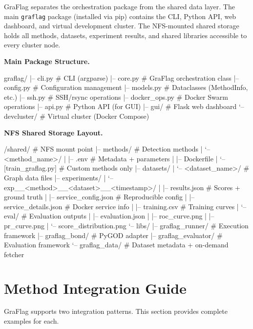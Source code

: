 \documentclass[twoside,11pt]{article}
\begin{document}
GraFlag separates the orchestration package from the shared data layer. The main \texttt{graflag} package (installed via pip) contains the CLI, Python API, web dashboard, and virtual development cluster. The NFS-mounted shared storage holds all methods, datasets, experiment results, and shared libraries accessible to every cluster node.

\textbf{Main Package Structure.}
\begin{codebox}
graflag/
|-- cli.py           # CLI (argparse)
|-- core.py          # GraFlag orchestration class
|-- config.py        # Configuration management
|-- models.py        # Dataclasses (MethodInfo, etc.)
|-- ssh.py           # SSH/rsync operations
|-- docker_ops.py    # Docker Swarm operations
|-- api.py           # Python API (for GUI)
|-- gui/             # Flask web dashboard
`-- devcluster/      # Virtual cluster (Docker Compose)
\end{codebox}

\textbf{NFS Shared Storage Layout.}
\begin{codebox}
/shared/                          # NFS mount point
|-- methods/                      # Detection methods
|   `-- <method_name>/
|       |-- .env                  # Metadata + parameters
|       |-- Dockerfile
|       `-- [train_graflag.py]    # Custom methods only
|-- datasets/
|   `-- <dataset_name>/           # Graph data files
|-- experiments/
|   `-- exp__<method>__<dataset>__<timestamp>/
|       |-- results.json          # Scores + ground truth
|       |-- service_config.json   # Reproducible config
|       |-- service_details.json  # Docker service info
|       |-- training.csv          # Training curves
|       `-- eval/                 # Evaluation outputs
|           |-- evaluation.json
|           |-- roc_curve.png
|           |-- pr_curve.png
|           `-- score_distribution.png
`-- libs/
    |-- graflag_runner/           # Execution framework
    |-- graflag_bond/             # PyGOD adapter
    |-- graflag_evaluator/        # Evaluation framework
    `-- graflag_data/             # Dataset metadata + on-demand fetcher
\end{codebox}

\section{Method Integration Guide}
\label{app:integration}

GraFlag supports two integration patterns. This section provides complete examples for each.
\end{document}
